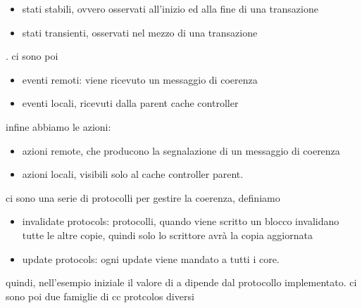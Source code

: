 \documentclass[12pt, oneside]{extbook} %
\begin{document}
\begin{itemize}
	\item stati stabili, ovvero osservati all'inizio ed alla fine di una transazione
	\item stati transienti, osservati nel mezzo di una transazione
\end{itemize}. ci sono poi
\begin{itemize}
\item eventi remoti: viene ricevuto un messaggio di coerenza
\item eventi locali, ricevuti dalla parent cache controller
\end{itemize}
infine abbiamo le azioni:
\begin{itemize}
	\item azioni remote, che producono la segnalazione di un messaggio di coerenza
	\item azioni locali, visibili solo al cache controller parent.
\end{itemize}
ci sono una serie di protocolli per gestire la coerenza, definiamo
\begin{itemize}
\item invalidate protocols: protocolli, quando viene scritto un blocco invalidano tutte le altre copie, quindi solo lo scrittore avrà la copia aggiornata
\item update protocols: ogni update viene mandato a tutti i core.
\end{itemize}
quindi, nell'esempio iniziale il valore di a dipende dal protocollo implementato. ci sono poi due famiglie di cc protcolos diversi
\end{document}
